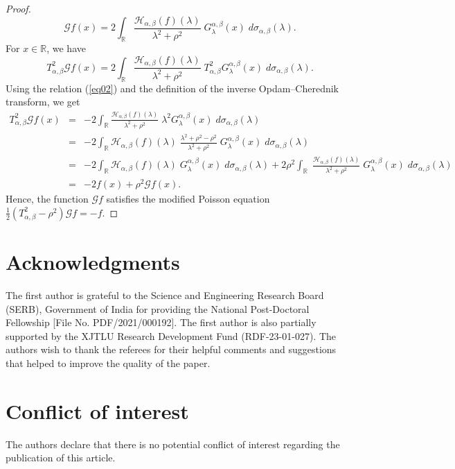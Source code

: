 \documentclass[a4paper,11pt, reqno]{amsart}
\theoremstyle{plain}
\theoremstyle{definition}
\theoremstyle{remark}
\def \R{{\mathbb R}}
\def\R{\mathbb R}
\def \H{{\mathcal H}}
\begin{document}
\begin{proof}
\[ \mathcal{G} f(x)= 2  \int_{\R} \frac{\H_{\alpha, \beta} (f) (\lambda)}{\lambda^2+\rho^2} \; G^{\alpha, \beta}_\lambda(x) \; d\sigma_{\alpha, \beta}(\lambda). \]
For $x \in \R$, we have
\[ T^2_{\alpha, \beta} \mathcal{G} f(x)= 2  \int_{\R} \frac{\H_{\alpha, \beta} (f) (\lambda)}{\lambda^2+\rho^2} \; T^2_{\alpha, \beta}G^{\alpha, \beta}_\lambda(x) \; d\sigma_{\alpha, \beta}(\lambda). \]
Using the relation (\ref{eq02}) and the definition of the inverse Opdam--Cherednik transform, we get
\begin{eqnarray*}
T^2_{\alpha, \beta} \mathcal{G} f(x)
& = & - 2  \int_{\R} \frac{\H_{\alpha, \beta} (f) (\lambda)}{\lambda^2+\rho^2} \;  \lambda^2  G^{\alpha, \beta}_\lambda(x) \; d\sigma_{\alpha, \beta}(\lambda) \\
& = & - 2  \int_{\R} \H_{\alpha, \beta} (f) (\lambda) \;  \frac{\lambda^2 + \rho^2 -\rho^2}{\lambda^2+\rho^2} \;    G^{\alpha, \beta}_\lambda(x) \; d\sigma_{\alpha, \beta}(\lambda) \\
& = & - 2  \int_{\R} \H_{\alpha, \beta} (f) (\lambda) \; G^{\alpha, \beta}_\lambda(x) \; d\sigma_{\alpha, \beta}(\lambda) + 2 \rho^2 \int_{\R}  \; \frac{\H_{\alpha, \beta} (f) (\lambda)}{\lambda^2+\rho^2} \; G^{\alpha, \beta}_\lambda(x) \; d\sigma_{\alpha, \beta}(\lambda) \\
& = & - 2 f(x) + \rho^2 \mathcal{G} f(x).
\end{eqnarray*}
Hence, the function $\mathcal{G} f$ satisfies the modified Poisson equation $\frac{1}{2} \left( T^2_{\alpha, \beta} - \rho^2 \right) \mathcal{G} f = - f$.  
\end{proof}


\section*{Acknowledgments}
The first author is grateful to the Science and Engineering Research Board (SERB), Government of India for providing the National Post-Doctoral Fellowship [File No. PDF/2021/000192]. The first author is also partially supported by the XJTLU Research Development Fund (RDF-23-01-027). The authors wish to thank the referees for their helpful comments and suggestions that helped to improve the quality of the paper.

\section*{Conflict of interest}
The authors declare that there is no potential conflict of interest regarding the publication of this article.
\end{document}
